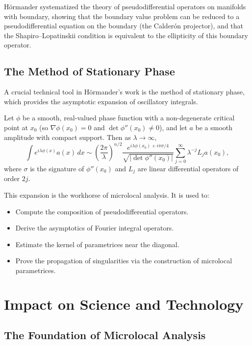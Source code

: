 H\"ormander systematized the theory of pseudodifferential operators on
manifolds with boundary, showing that the boundary value problem can be
reduced to a pseudodifferential equation on the boundary (the
Calder\'on projector), and that the Shapiro--Lopatinskii condition is
equivalent to the ellipticity of this boundary operator.

\subsection{The Method of Stationary Phase}

A crucial technical tool in H\"ormander's work is the method of
stationary phase, which provides the asymptotic expansion of
oscillatory integrals.

\begin{theorem}
Let \(\phi\) be a smooth, real-valued phase function with a
non-degenerate critical point at \(x_0\) (so \(\nabla\phi(x_0) = 0\)
and \(\det \phi''(x_0) \neq 0\)), and let \(a\) be a smooth amplitude
with compact support. Then as \(\lambda \to \infty\),
\[
\int e^{i\lambda \phi(x)} a(x) \,dx \sim
\left(\frac{2\pi}{\lambda}\right)^{n/2}
\frac{e^{i\lambda \phi(x_0) + i\pi\sigma/4}}{\sqrt{|\det\phi''(x_0)|}}
\sum_{j=0}^\infty \lambda^{-j} L_j a(x_0),
\]
where \(\sigma\) is the signature of \(\phi''(x_0)\) and \(L_j\) are
linear differential operators of order \(2j\).
\end{theorem}

This expansion is the workhorse of microlocal analysis. It is used to:
\begin{itemize}
    \item Compute the composition of pseudodifferential operators.
    \item Derive the asymptotics of Fourier integral operators.
    \item Estimate the kernel of parametrices near the diagonal.
    \item Prove the propagation of singularities via the
    construction of microlocal parametrices.
\end{itemize}

\section{Impact on Science and Technology}

\subsection{The Foundation of Microlocal Analysis}

